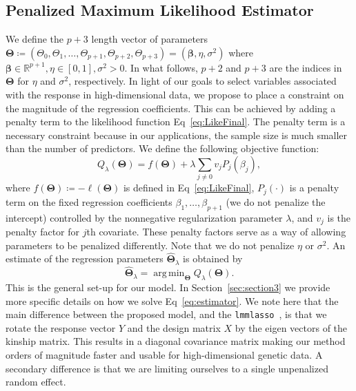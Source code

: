 \documentclass[10pt,letterpaper]{article}
\newcommand{\bTheta}{\boldsymbol{\Theta}}
\newcommand{\bbeta}{\boldsymbol{\beta}}
\DeclareMathOperator*{\argmin}{arg\,min}
\begin{document}



\subsection*{Penalized Maximum Likelihood Estimator}
We define the $p+3$  length vector of parameters $\bTheta \coloneqq \left(\Theta_0, \Theta_1, \ldots, \Theta_{p+1}, \Theta_{p+2}, \Theta_{p+3}\right) =  \left(\bbeta, \eta, \sigma^2 \right)$ where $\bbeta \in \mathbb{R}^{p+1}, \eta \in [0,1], \sigma^2 >0$. In what follows, $p+2$ and $p+3$ are the indices in $\bTheta$ for $\eta$ and $\sigma^2$, respectively. In light of our goals to select variables associated with the response in high-dimensional data, we propose to place a constraint on the magnitude of the regression coefficients. This can be achieved by adding a penalty term to the likelihood function Eq~\ref{eq:LikeFinal}. The penalty term is a necessary constraint because in our applications, the sample size is much smaller than the number of predictors. We define the following objective function:
\begin{equation*}
Q_{\lambda}(\bTheta) = f(\bTheta) + \lambda \sum_{j\neq 0} v_j P_j(\beta_j),
\end{equation*}
where $f(\bTheta)\coloneqq-\ell(\bTheta)$ is defined in Eq~\ref{eq:LikeFinal}, $P_j(\cdot)$ is a penalty term on the fixed regression coefficients $\beta_1, \ldots, \beta_{p+1}$ (we do not penalize the intercept) controlled by the nonnegative regularization parameter $\lambda$, and $v_j$ is the penalty factor for $j$th covariate. These penalty factors serve as a way of allowing parameters to be penalized differently. Note that we do not penalize $\eta$ or $\sigma^2$. An estimate of the regression parameters $\widehat{\bTheta}_{\lambda}$ is obtained by
\begin{equation}
\widehat{\bTheta}_{\lambda} = \argmin_{\bTheta} Q_{\lambda}(\bTheta) \label{eq:estimator}.
\end{equation}
This is the general set-up for our model. In Section~\ref{sec:section3} we provide more specific details on how we solve Eq~\ref{eq:estimator}. We note here that the main difference between the proposed model, and the \texttt{lmmlasso}~\cite{schelldorfer2011estimation}, is that we rotate the response vector $Y$ and the design matrix $X$ by the eigen vectors of the kinship matrix. This results in a diagonal covariance matrix making our method orders of magnitude faster and usable for high-dimensional genetic data. A secondary difference is that we are limiting ourselves to a single unpenalized random effect.
\end{document}
